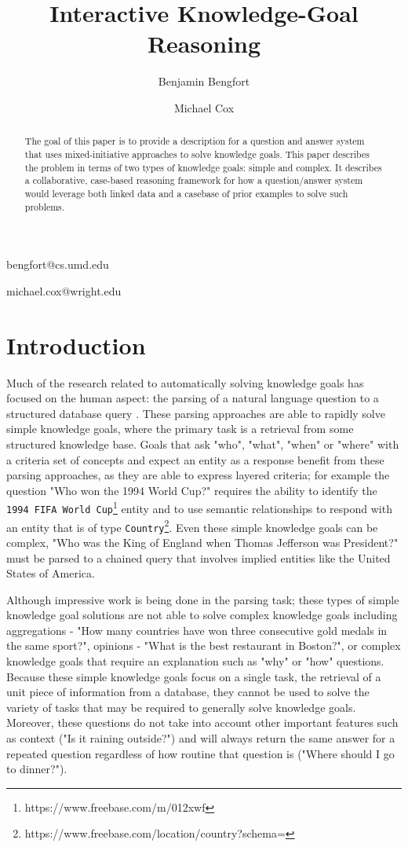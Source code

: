 \documentclass[11pt,letterpaper]{article}
\begin{document}
\title{Interactive Knowledge-Goal Reasoning}

\author{Benjamin Bengfort}{bengfort@cs.umd.edu}
\address{Department of Computer Science, University of Maryland,
         College Park, MD 20742 USA}
\author{Michael Cox}{michael.cox@wright.edu}
\address{Wright State Research Institute,
         Beavercreek, OH 45431 USA}
\vskip 0.2in
 
\begin{abstract}
The goal of this paper is to provide a description for a question and answer system that uses mixed-initiative approaches to solve knowledge goals. This paper describes the problem in terms of two types of knowledge goals: simple and complex. It describes a collaborative, case-based reasoning framework for how a question/answer system would leverage both linked data and a casebase of prior examples to solve such problems.
\end{abstract}

\section{Introduction}

Much of the research related to automatically solving knowledge goals has focused on the human aspect: the parsing of a natural language question to a structured database query \cite{yahya_natural_2012,unger_template-based_2012,berant_semantic_2013}. These parsing approaches are able to rapidly solve simple knowledge goals, where the primary task is a retrieval from some structured knowledge base. Goals that ask "who", "what", "when" or "where" with a criteria set of concepts and expect an entity as a response benefit from these parsing approaches, as they are able to express layered criteria; for example the question "Who won the 1994 World Cup?" requires the ability to identify the \texttt{1994 FIFA World Cup}\footnote{https://www.freebase.com/m/012xwf} entity and to use semantic relationships to respond with an entity that is of type \texttt{Country}\footnote{https://www.freebase.com/location/country?schema=}. Even these simple knowledge goals can be complex, "Who was the King of England when Thomas Jefferson was President?" must be parsed to a chained query that involves implied entities like the United States of America.

Although impressive work is being done in the parsing task; these types of simple knowledge goal solutions are not able to solve complex knowledge goals including aggregations - "How many countries have won three consecutive gold medals in the same sport?", opinions - "What is the best restaurant in Boston?", or complex knowledge goals that require an explanation such as "why" or "how" questions. Because these simple knowledge goals focus on a single task, the retrieval of a unit piece of information from a database, they cannot be used to solve the variety of tasks that may be required to generally solve knowledge goals. Moreover, these questions do not take into account other important features such as context ("Is it raining outside?") and will always return the same answer for a repeated question regardless of how routine that question is ("Where should I go to dinner?").
\end{document}
